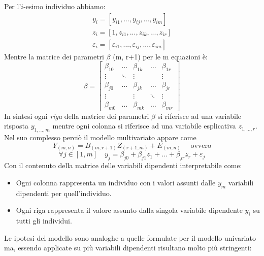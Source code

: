 \documentclass[a4page, 11pt]{article} %
\begin{document}
Per l'$i$-esimo individuo abbiamo:
\begin{align*}
y_i = [y_{i1},...,y_{ij},...,y_{im}]\\
z_i = [1,z_{i1},...,z_{ik},...,z_{ir}]\\
\varepsilon_i = [\varepsilon_{i1},...,\varepsilon_{ij},...,\varepsilon_{im}]
\end{align*}
Mentre la matrice dei parametri $\beta$ (m, r+1) per le m equazioni è:
\[
\beta =
\begin{bmatrix}
\beta_{10} & \dots & \beta_{1k} & \dots & \beta_{1r} \\
\vdots& \ddots & \vdots& &\vdots \\
\beta_{j0} & \dots & \beta_{jk} & \dots & \beta_{jr} \\
\vdots& &\vdots& \ddots &\vdots \\
\beta_{m0} & \dots & \beta_{mk} & \dots & \beta_{mr} 
\end{bmatrix}
\]
In sintesi ogni \textit{riga} della matrice dei parametri $\beta$ si riferisce ad una variabile risposta $y_{1,...,m}$ mentre ogni colonna si riferisce ad una variabile esplicativa $z_{1,...,r}$. 
\newline
Nel suo complesso perciò il modello multivariato appare come 
\[ Y_{(m,n)} = B_{(m,r+1)}Z_{(r+1,m)} + E_{(m,n)} \quad \text{ ovvero}\]
\[ \forall j \in [1,m] \quad y_j= \beta_{j0} + \beta_{j1}z_1 + \dots + \beta_{jr}z_r + \varepsilon_j \]
Con il contenuto della matrice delle variabili dipendenti interpretabile come:
\begin{itemize}[noitemsep]
\item Ogni colonna rappresenta un individuo con i valori assunti dalle $y_m$ variabili dipendenti per quell'individuo.
\item Ogni riga rappresenta il valore assunto dalla singola variabile dipendente $y_i$ su tutti gli individui.
\end{itemize}
Le ipotesi del modello sono analoghe a quelle formulate per il modello univariato ma, essendo applicate su più variabili dipendenti risultano molto più stringenti:
\end{document}
